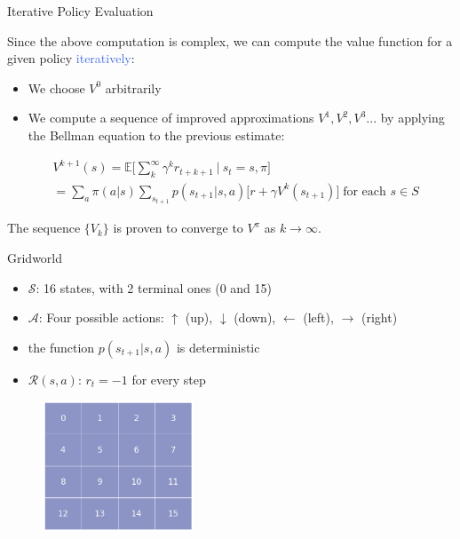 \documentclass{beamer}
\begin{document}
\begin{frame}{Iterative Policy Evaluation}

Since the above computation is complex, we can compute the value function for a given policy \textcolor{RoyalBlue}{iteratively}:
\begin{itemize}
    \item We choose $V^0$ arbitrarily
    \item We compute a sequence of improved approximations $V^1, V^2, V^3 ...$  by applying the Bellman equation to the previous estimate:
\end{itemize}

\begin{align*}
    &V^{k+1}(s) = \mathds{E} \bigg[\sum_{k}^{\infty}\gamma^{k} r_{t+k+1} \: \bigg| \: s_t=s,\pi \bigg] \\
		   & = \sum_a \pi(a|s) \sum_{s_{t+1}} p(s_{t+1}|s,a)\big[r + \gamma V^{k}(s_{t+1}) \big] \; \text{for each } s \in S
\end{align*}

The sequence $\{V_k\}$ is proven to converge to $V^{\pi}$ as $k \rightarrow \infty $.

\end{frame}



\begin{frame}{Gridworld}

\begin{itemize}
    \item $\mathcal{S}$: 16 states, with 2 terminal ones (0 and 15)
    \item $\mathcal{A}$: Four possible actions: $\uparrow$ (up), $\downarrow$ (down), $\leftarrow$ (left), $\rightarrow$ (right)
    \item the function $p(s_{t+1}|s,a)$ is deterministic
\item $\mathcal{R}(s,a)$: $r_t = -1$ for every step
\end{itemize}

\begin{figure}[t]
\includegraphics[width=4.5cm]{./images/GridWorld.png}
\centering
\end{figure}


\end{frame}
\end{document}
